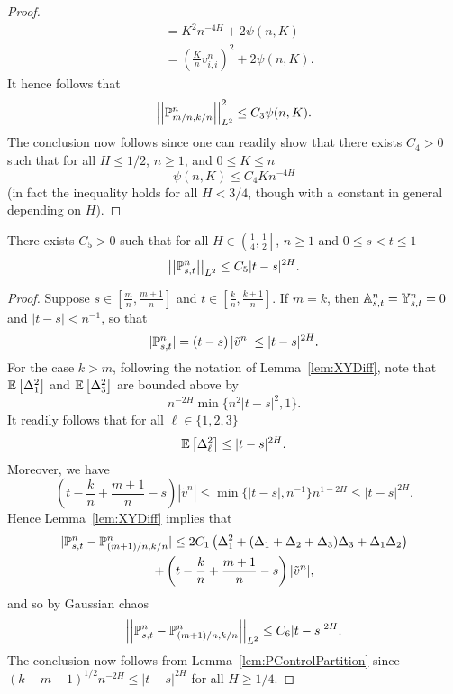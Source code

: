 \documentclass{article}
\begin{document}
\begin{proof}
\begin{align*}
&= K^2 n^{-4H} + 2\psi(n,K) \\
&= \left(\frac{K}{n}v^n_{i,i}\right)^2 + 2\psi(n,K).
\end{align*}
It hence follows that
\[
\norm{\Pbb^n_{m/n, k/n}}_{L^2}^2 \leq C_3\psi(n,K).
\]
The conclusion now follows since one can readily show that there exists $C_4 > 0$ such that for all $H \leq 1/2$, $n \geq 1$, and $0 \leq K \leq n$
\[
\psi(n,K) \leq C_4K n^{-4H}
\]
(in fact the inequality holds for all $H < 3/4$, though with a constant in general depending on $H$).
\end{proof}


\begin{lemma}\label{lem:YPBounds}
There exists $C_5 > 0$ such that for all $H \in \left(\frac{1}{4},\frac{1}{2}\right]$, $n \geq 1$ and $0 \leq s < t \leq 1$
\[
\left|\left|\mathbb P^n_{s,t} \right|\right|_{L^2} \leq C_5|t-s|^{2H}.
\]
\end{lemma}

\begin{proof}
Suppose $s \in [\frac{m}{n},\frac{m+1}{n}]$ and $t \in [\frac{k}{n}, \frac{k+1}{n}]$.
If $m=k$, then $\mathbb A^n_{s,t} = \mathbb Y^n_{s,t} = 0$ and $|t-s| < n^{-1}$, so that
\[
|\mathbb P^n_{s,t}| = \left(t- s\right)|\tilde v^n| \leq |t-s|^{2H}.
\]
For the case $k > m$, following the notation of Lemma~\ref{lem:XYDiff}, note that $\mathbb E \left[ \Delta_1^2 \right]$ and $\mathbb E \left[ \Delta_3^2 \right]$ are bounded above by
\[
n^{-2H} \min\{n^2|t-s|^2,1\}.
\]
It readily follows that for all $\ell \in \{1,2,3\}$
\[
\mathbb E \left[ \Delta^2_\ell \right] \leq |t-s|^{2H}.
\]
Moreover, we have
\[
\left(t-\frac{k}{n} + \frac{m+1}{n} - s\right)|\tilde v^n| \leq \min \{|t-s|, n^{-1} \} n^{1-2H} \leq |t-s|^{2H}.
\]
Hence Lemma~\ref{lem:XYDiff} implies that
\begin{multline*}
|\mathbb P^n_{s,t} - \mathbb P^n_{(m+1)/n, k/n}| \leq 2C_1\left(\Delta_1^2 + (\Delta_1+ \Delta_2 + \Delta_3)\Delta_3 + \Delta_1 \Delta_2 \right) \\ + \left(t-\frac{k}{n} + \frac{m+1}{n} - s\right)|\tilde v^n|,
\end{multline*}
and so by Gaussian chaos
\[
\left|\left|\mathbb P^n_{s,t} - \mathbb P^n_{(m+1)/n, k/n} \right|\right|_{L^2} \leq C_6|t-s|^{2H}.
\]
The conclusion now follows from Lemma~\ref{lem:PControlPartition} since $(k-m-1)^{1/2}n^{-2H} \leq |t-s|^{2H}$ for all $H \geq 1/4$.
\end{proof}
\end{document}
